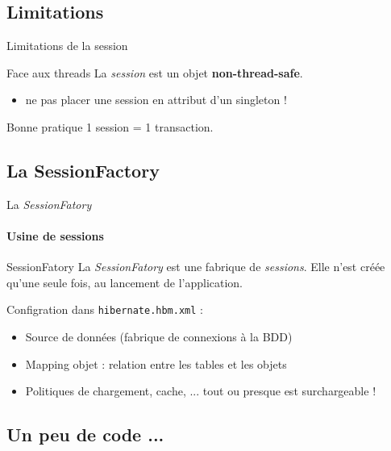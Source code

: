 \documentclass[compact]{beamer}%
\begin{document}
\subsection{Limitations}
\begin{frame}{Limitations de la session}
	\begin{alertblock}{Face aux threads}
	La \emph{session} est un objet \textbf{non-thread-safe}.
	\end{alertblock}

	\pause
	\begin{itemize}
		\item ne pas placer une session en attribut d'un singleton !
	\end{itemize}

	
	\pause
	\begin{block}{Bonne pratique}
	1 session = 1 transaction.
	\end{block}
	
\end{frame}



\subsection{La SessionFactory}

\begin{frame}{La \emph{SessionFatory}}
	\framesubtitle{Usine de sessions}
	
	\begin{block}{SessionFatory}
	La \emph{SessionFatory} est une fabrique de \emph{sessions}. Elle n'est créée qu'une seule fois, au lancement de l'application.
	\end{block}	
	
	\pause	
	Configration dans \texttt{hibernate.hbm.xml} :
	\begin{itemize}
	\item Source de données (fabrique de connexions à la BDD)
	\item Mapping objet : relation entre les tables et les objets
	\item Politiques de chargement, cache, ... tout ou presque est surchargeable !
	\end{itemize}
\end{frame}

	
\subsection{Un peu de code ...}
\end{document}
